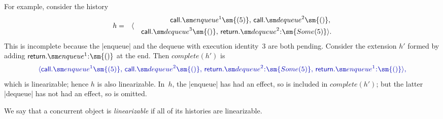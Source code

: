 For example, consider the history
\begin{eqnarray*}
h & = & \langle
  \begin{align} 
  \call.\enqueue^1\sm{(5)},\, \call.\dequeue^2\sm{()},\, \\
  \quad  \call.\dequeue^3\sm{()},\,  \return.\dequeue^2\::\sm{Some(5)} \rangle.
  \end{align}
\end{eqnarray*}
This is incomplete because the |enqueue| and the dequeue with execution
identity~$3$ are both pending.  Consider the extension $h'$ formed by adding
$\return.\enqueue^1\::\sm{()}$ at the end.  Then $complete(h')$ is
\[\mstyle
\langle 
  \call.\enqueue^1\sm{(5)},\, \call.\dequeue^2\sm{()},\,
  \return.\dequeue^2\::\sm{Some(5)},\, \return.\enqueue^1\::\sm{()}\rangle,
\]
which is linearizable; hence $h$ is also linearizable.  In~$h$, the |enqueue|
has had an effect, so is included in $complete(h')$; but the latter |dequeue|
has not had an effect, so is omitted.

We say that a concurrent object is \emph{linearizable} if all of its histories
are linearizable.


